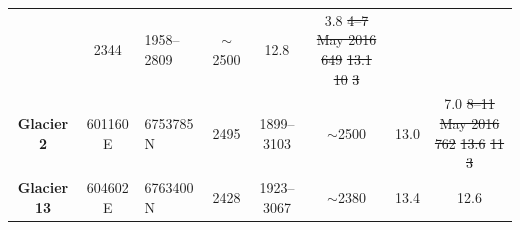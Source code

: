 \documentclass[review,oneside, letterpaper]{igs} %
\providecommand{\DIFdel}[1]{{\protect\color{red}\sout{#1}}}                      %
\providecommand{\DIFdelFL}[1]{\DIFdel{#1}} %
\providecommand{\DIFaddbeginFL}{} %
\providecommand{\DIFaddendFL}{} %
\providecommand{\DIFdelbeginFL}{} %
\providecommand{\DIFdelendFL}{} %
\newcommand{\DIFscaledelfig}{0.5}
\newlength{\DIFdelgraphicswidth} %
\newlength{\DIFdelgraphicsheight} %
\newcommand{\DIFaddincludegraphics}[2][]{{\color{blue}\fbox{\DIFOincludegraphics[#1]{#2}}}} %
\newcommand{\DIFdelincludegraphics}[2][]{%
\sbox{\DIFdelgraphicsbox}{\DIFOincludegraphics[#1]{#2}}%
\settoboxwidth{\DIFdelgraphicswidth}{\DIFdelgraphicsbox} %
\settoboxtotalheight{\DIFdelgraphicsheight}{\DIFdelgraphicsbox} %
\scalebox{\DIFscaledelfig}{%
\parbox[b]{\DIFdelgraphicswidth}{\usebox{\DIFdelgraphicsbox}\\[-\baselineskip] \rule{\DIFdelgraphicswidth}{0em}}\llap{\resizebox{\DIFdelgraphicswidth}{\DIFdelgraphicsheight}{%
\setlength{\unitlength}{\DIFdelgraphicswidth}%
\begin{picture}(1,1)%
\thicklines\linethickness{2pt} %
{\color[rgb]{1,0,0}\put(0,0){\framebox(1,1){}}}%
{\color[rgb]{1,0,0}\put(0,0){\line( 1,1){1}}}%
{\color[rgb]{1,0,0}\put(0,1){\line(1,-1){1}}}%
\end{picture}%
}\hspace*{3pt}}} %
} %
\DeclareRobustCommand{\DIFaddbeginFL}{\DIFOaddbeginFL \let\includegraphics\DIFaddincludegraphics} %
\DeclareRobustCommand{\DIFaddendFL}{\DIFOaddendFL \let\includegraphics\DIFOincludegraphics} %
\DeclareRobustCommand{\DIFdelbeginFL}{\DIFOdelbeginFL \let\includegraphics\DIFdelincludegraphics} %
\DeclareRobustCommand{\DIFdelendFL}{\DIFOaddendFL \let\includegraphics\DIFOincludegraphics} %
\begin{document}
\begin{table}[]
\begin{tabular}{cclccccc}
\DIFdelendFL & 2344 & 1958--2809 & $\sim$2500 & 12.8 & 3.8 \DIFdelbeginFL %
\DIFdelFL{4--7 May 2016 }%
\DIFdelFL{649 }%
\DIFdelFL{13.1 }%
\DIFdelFL{10 }%
\DIFdelFL{3 }\DIFdelendFL \\
\textbf{Glacier 2} & \DIFdelbeginFL %
\DIFdelendFL 601160 E \DIFdelbeginFL %
\DIFdelendFL \DIFaddbeginFL & \DIFaddendFL 6753785 N \DIFdelbeginFL %
\DIFdelendFL & 2495 & 1899--3103 & $\sim$2500 & 13.0 & 7.0 \DIFdelbeginFL %
\DIFdelFL{8--11 May 2016 }%
\DIFdelFL{762 }%
\DIFdelFL{13.6 }%
\DIFdelFL{11 }%
\DIFdelFL{3 }\DIFdelendFL \\
\textbf{Glacier 13} & \DIFdelbeginFL %
\DIFdelendFL 604602 E \DIFdelbeginFL %
\DIFdelendFL \DIFaddbeginFL & \DIFaddendFL 6763400 N \DIFdelbeginFL %
\DIFdelendFL & 2428 & 1923--3067 & $\sim$2380 & 13.4 & 12.6
\DIFaddbeginFL \end{tabular}
\end{table}
\end{document}
